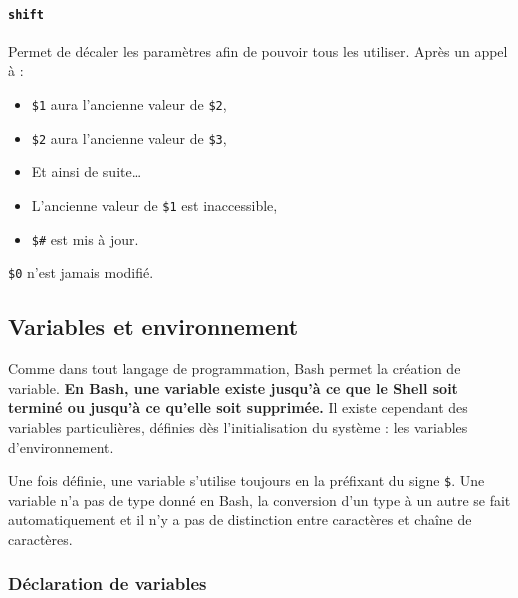 \paragraph{\texttt{shift}} 
Permet de décaler les paramètres afin de pouvoir tous les utiliser. Après un appel à  : 
\begin{itemize}
    \item \texttt{\$1} aura l'ancienne valeur de \texttt{\$2},
    \item \texttt{\$2} aura l'ancienne valeur de \texttt{\$3},
    \item Et ainsi de suite\dots
    \item L'ancienne valeur de \texttt{\$1} est inaccessible,
    \item \texttt{\$\#} est mis à jour.
\end{itemize}

 \texttt{\$0} n'est jamais modifié.

\newpage


\subsection{Variables et environnement}

Comme dans tout langage de programmation, Bash permet la création de variable. \textbf{En Bash, une variable existe jusqu'à ce que le Shell soit terminé ou jusqu'à ce qu'elle soit supprimée.} Il existe cependant des variables particulières, définies dès l'initialisation du système : les variables d'environnement.

Une fois définie, une variable s'utilise toujours en la préfixant du signe \texttt{\$}. Une variable n'a pas de type donné en Bash, la conversion d'un type à un autre se fait automatiquement et il n'y a pas de distinction entre caractères et chaîne de caractères.

\subsubsection{Déclaration de variables} 

